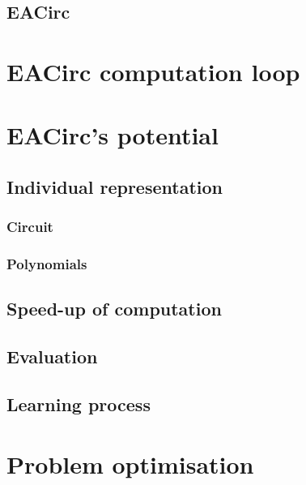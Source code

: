 \documentclass[
  print, %
  Table,   %
  nolof,     %
  nolot,     %
  11pt, %
  oneside  %
]{fithesis3}
\begin{document}
\subsection{EACirc}
\label{subsec:eacirc}

\section{EACirc computation loop}
\label{sec:eac-comp}

\section{EACirc's potential}
\label{sec:eac-potential}

\subsection{Individual representation}
\label{subsec:eac-indiv-repres}

\subsubsection{Circuit}
\label{subsubsec:eac-indiv-repres-circuit}

\subsubsection{Polynomials}
\label{subsubsec:eac-indiv-repres-poly}

\subsection{Speed-up of computation}
\label{subsec:eac-speedup}

\subsection{Evaluation}
\label{subsec:eac-eval}

\subsection{Learning process}
\label{subsec:eac-learning}


\section{Problem optimisation}
\label{sec:prob-opt}
\end{document}
